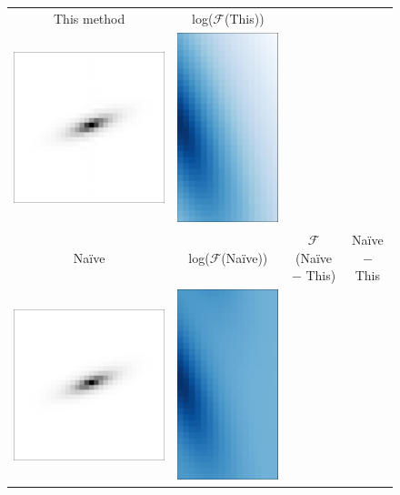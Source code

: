 \documentclass[11pt,preprint]{aastex}
\begin{document}
\begin{figure}[p!]
  \newcommand{\F}{$\mathcal{F}$}
  \begin{center}
    \begin{tabular}{@{}ccccc@{}}
      This method
      &
      log(\F(This))
      &
      \\
      \includegraphics[height=0.24\textwidth]{lopass-mine-pix}
      &
      \includegraphics[height=0.24\textwidth]{lopass-mine-logfourier}
      &
      \\
      Na\"ive
      & log(\F(Na\"ive))
      &
      \multicolumn{2}{c}{\F(Na\"ive $-$ This)}
      & Na\"ive $-$ This
      \\
      \includegraphics[height=0.24\textwidth]{lopass-naive-pix}
      &
      \includegraphics[height=0.24\textwidth]{lopass-naive-logfourier}

\end{tabular}
\end{center}
\end{figure}
\end{document}
